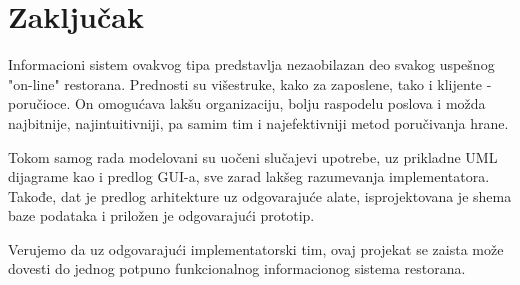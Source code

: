 \newpage
\section{Zaključak}
Informacioni sistem ovakvog tipa predstavlja nezaobilazan deo svakog uspešnog "on-line" restorana. Prednosti su višestruke, kako za zaposlene, tako i klijente - poručioce. On omogućava lakšu organizaciju, bolju raspodelu poslova i možda najbitnije, najintuitivniji, pa samim tim i najefektivniji metod poručivanja hrane.

Tokom samog rada modelovani su uočeni slučajevi upotrebe, uz prikladne UML dijagrame kao i predlog GUI-a, sve zarad lakšeg razumevanja implementatora. Takođe, dat je predlog arhitekture uz odgovarajuće alate, isprojektovana je shema baze podataka i priložen je odgovarajući prototip.

Verujemo da uz odgovarajući implementatorski tim, ovaj projekat se zaista može dovesti do jednog potpuno funkcionalnog informacionog sistema restorana.

